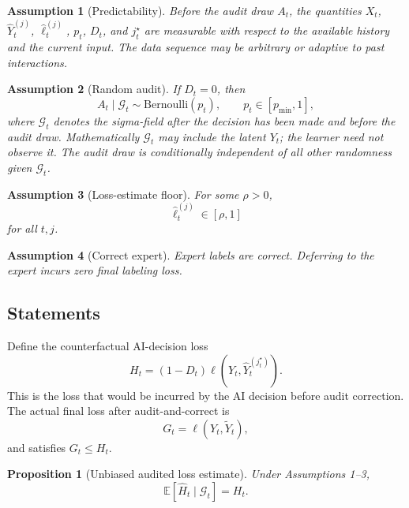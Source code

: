 \documentclass[11pt]{article}
\newtheorem{proposition}{Proposition}
\newtheorem{assumption}{Assumption}
\newcommand{\E}{\mathbb{E}}
\newcommand{\1}{\mathbf{1}}
\newcommand{\calG}{\mathcal{G}}
\newcommand{\Yhat}{\widehat Y}
\newcommand{\ellhat}{\widehat\ell}
\newcommand{\Hhat}{\widehat H}
\begin{document}
\begin{assumption}[Predictability]
Before the audit draw $A_t$, the quantities $X_t$, $\Yhat_t^{(j)}$, $\ellhat_t^{(j)}$, $p_t$, $D_t$, and $j_t^\star$ are measurable with respect to the available history and the current input. The data sequence may be arbitrary or adaptive to past interactions.
\end{assumption}

\begin{assumption}[Random audit]
If $D_t=0$, then
\[
A_t\mid \calG_t\sim\mathrm{Bernoulli}(p_t),\qquad p_t\in[p_{\min},1],
\]
where $\calG_t$ denotes the sigma-field after the decision has been made and before the audit draw. Mathematically $\calG_t$ may include the latent $Y_t$; the learner need not observe it. The audit draw is conditionally independent of all other randomness given $\calG_t$.
\end{assumption}

\begin{assumption}[Loss-estimate floor]
For some $\rho>0$,
\[
\ellhat_t^{(j)}\in[\rho,1]
\]
for all $t,j$.
\end{assumption}

\begin{assumption}[Correct expert]
Expert labels are correct. Deferring to the expert incurs zero final labeling loss.
\end{assumption}

\subsection{Statements}

Define the counterfactual AI-decision loss
\[
H_t=(1-D_t)\ell(Y_t,\Yhat_t^{(j_t^\star)}).
\]
This is the loss that would be incurred by the AI decision before audit correction. The actual final loss after audit-and-correct is
\[
G_t=\ell(Y_t,\widetilde Y_t),
\]
and satisfies $G_t\le H_t$.

\begin{proposition}[Unbiased audited loss estimate]
Under Assumptions 1--3,
\[
\E[\Hhat_t\mid\calG_t]=H_t.
\]
\end{proposition}
\end{document}
